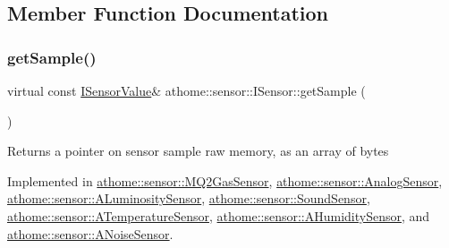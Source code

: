 \subsection{Member Function Documentation}
\mbox{\label{classathome_1_1sensor_1_1_i_sensor_ae109cd3741ea9c88dc7e4f2eaf1485d5}} 
\subsubsection{\texorpdfstring{get\+Sample()}{getSample()}}
{\footnotesize\ttfamily virtual const \mbox{\hyperlink{structathome_1_1sensor_1_1_i_sensor_1_1_i_sensor_value}{I\+Sensor\+Value}}\& athome\+::sensor\+::\+I\+Sensor\+::get\+Sample (\begin{DoxyParamCaption}{ }\end{DoxyParamCaption})\hspace{0.3cm}{\ttfamily [pure virtual]}}

Returns a pointer on sensor sample raw memory, as an array of bytes 

Implemented in \mbox{\hyperlink{classathome_1_1sensor_1_1_m_q2_gas_sensor_adbe1195490ce67fbed7c717abe2b5b13}{athome\+::sensor\+::\+M\+Q2\+Gas\+Sensor}}, \mbox{\hyperlink{classathome_1_1sensor_1_1_analog_sensor_a7ad00f985a9d1abeb64f973b5d16558c}{athome\+::sensor\+::\+Analog\+Sensor}}, \mbox{\hyperlink{classathome_1_1sensor_1_1_a_luminosity_sensor_a6e0e7bcfe13cd8d8edf6a09f6e230ef8}{athome\+::sensor\+::\+A\+Luminosity\+Sensor}}, \mbox{\hyperlink{classathome_1_1sensor_1_1_sound_sensor_a8ac5f417eee873247aff8a7e96e12817}{athome\+::sensor\+::\+Sound\+Sensor}}, \mbox{\hyperlink{classathome_1_1sensor_1_1_a_temperature_sensor_afea6a461b8dff9ee736aa508aa4f6a3c}{athome\+::sensor\+::\+A\+Temperature\+Sensor}}, \mbox{\hyperlink{classathome_1_1sensor_1_1_a_humidity_sensor_a7af4527c70b539bec58cecfaae0aa80e}{athome\+::sensor\+::\+A\+Humidity\+Sensor}}, and \mbox{\hyperlink{classathome_1_1sensor_1_1_a_noise_sensor_ab567b050b41bd0b72fcc9b94b9f6fc6e}{athome\+::sensor\+::\+A\+Noise\+Sensor}}.

\mbox{\label{classathome_1_1sensor_1_1_i_sensor_af86df8538fecfcfc670b4adfbbde6abb}} 
